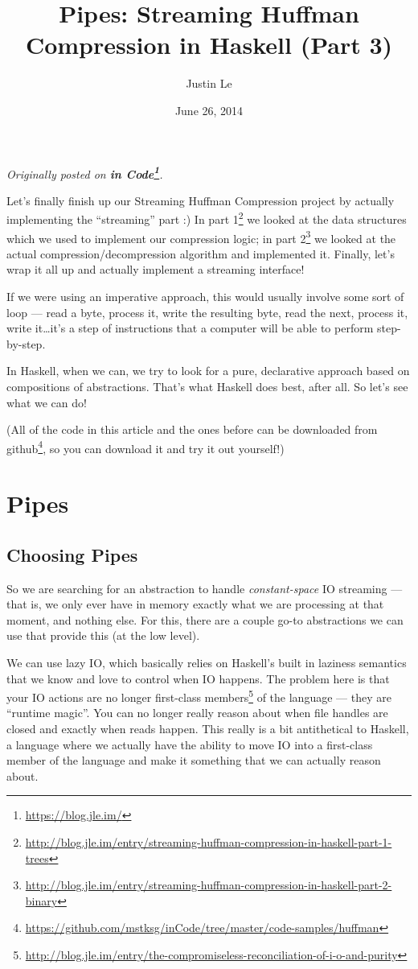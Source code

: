 \documentclass[]{article}
\title{Pipes: Streaming Huffman Compression in Haskell (Part 3)}
\author{Justin Le}
\date{June 26, 2014}
\renewcommand{\href}[2]{#2\footnote{\url{#1}}}
\begin{document}
\maketitle

\emph{Originally posted on \textbf{\href{https://blog.jle.im/}{in
Code}}.}

Let's finally finish up our Streaming Huffman Compression project by
actually implementing the ``streaming'' part :) In
\href{http://blog.jle.im/entry/streaming-huffman-compression-in-haskell-part-1-trees}{part
1} we looked at the data structures which we used to implement our
compression logic; in
\href{http://blog.jle.im/entry/streaming-huffman-compression-in-haskell-part-2-binary}{part
2} we looked at the actual compression/decompression algorithm and
implemented it. Finally, let's wrap it all up and actually implement a
streaming interface!

If we were using an imperative approach, this would usually involve some
sort of loop --- read a byte, process it, write the resulting byte, read
the next, process it, write it\ldots{}it's a step of instructions that a
computer will be able to perform step-by-step.

In Haskell, when we can, we try to look for a pure, declarative approach
based on compositions of abstractions. That's what Haskell does best,
after all. So let's see what we can do!

(All of the code in this article and the ones before can be downloaded
\href{https://github.com/mstksg/inCode/tree/master/code-samples/huffman}{from
github}, so you can download it and try it out yourself!)

\section{Pipes}\label{pipes}

\subsection{Choosing Pipes}\label{choosing-pipes}

So we are searching for an abstraction to handle \emph{constant-space}
IO streaming --- that is, we only ever have in memory exactly what we
are processing at that moment, and nothing else. For this, there are a
couple go-to abstractions we can use that provide this (at the low
level).

We can use lazy IO, which basically relies on Haskell's built in
laziness semantics that we know and love to control when IO happens. The
problem here is that your IO actions are no longer
\href{http://blog.jle.im/entry/the-compromiseless-reconciliation-of-i-o-and-purity}{first-class
members} of the language --- they are ``runtime magic''. You can no
longer really reason about when file handles are closed and exactly when
reads happen. This really is a bit antithetical to Haskell, a language
where we actually have the ability to move IO into a first-class member
of the language and make it something that we can actually reason about.
\end{document}
